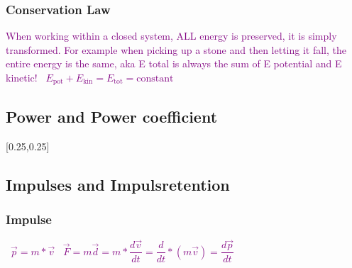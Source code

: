 \documentclass[main.tex,fontsize=8pt,paper=a4,paper=portrait,DIV=calc,]{scrartcl}
\begin{document}
\begin{multicols*}{2}
\subsubsection{Conservation Law}
\textcolor{purple}{When working within a closed system, ALL energy is preserved, it is simply transformed.\newline
For example when picking up a stone and then letting it fall, the entire energy is the same, aka E total is always the sum of E potential and E kinetic!}\newline
\, \newline
\large \textcolor{purple}{\( E_{\text{pot}} + E_{\text{kin}} = E_{\text{tot}} = \text{constant}\)}\newline
\, \newline
\normalsize 

\subsection{Power and Power coefficient}
[0.25,0.25]

\subsection{Impulses and Impulsretention}
\subsubsection{Impulse}
\, \newline
\large \textcolor{purple}{\( \vec{p} = m * \vec{v} \)}\newline
\, \newline
\textcolor{purple}{\( \vec{F} = m\vec{d} = m * \dfrac{d\vec{v}}{dt} = \dfrac{d}{dt} * (m\vec{v}) = \dfrac{d\vec{p}}{dt} \)}\newline
\normalsize \, \newline


\end{multicols*}
\end{document}
